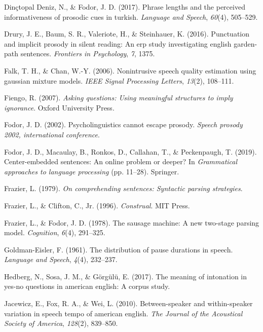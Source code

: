 \documentclass[12pt,oneside]{book}
\begin{document}
\leavevmode\hypertarget{ref-nazik}{}%
Dinçtopal Deniz, N., \& Fodor, J. D. (2017). Phrase lengths and the perceived informativeness of prosodic cues in turkish. \emph{Language and Speech}, \emph{60}(4), 505--529.

\leavevmode\hypertarget{ref-cps}{}%
Drury, J. E., Baum, S. R., Valeriote, H., \& Steinhauer, K. (2016). Punctuation and implicit prosody in silent reading: An erp study investigating english garden-path sentences. \emph{Frontiers in Psychology}, \emph{7}, 1375.

\leavevmode\hypertarget{ref-gmm1}{}%
Falk, T. H., \& Chan, W.-Y. (2006). Nonintrusive speech quality estimation using gaussian mixture models. \emph{IEEE Signal Processing Letters}, \emph{13}(2), 108--111.

\leavevmode\hypertarget{ref-fiengo}{}%
Fiengo, R. (2007). \emph{Asking questions: Using meaningful structures to imply ignorance}. Oxford University Press.

\leavevmode\hypertarget{ref-Fodor2002-io}{}%
Fodor, J. D. (2002). Psycholinguistics cannot escape prosody. \emph{Speech prosody 2002, international conference}.

\leavevmode\hypertarget{ref-fodor2019center}{}%
Fodor, J. D., Macaulay, B., Ronkos, D., Callahan, T., \& Peckenpaugh, T. (2019). Center-embedded sentences: An online problem or deeper? In \emph{Grammatical approaches to language processing} (pp. 11--28). Springer.

\leavevmode\hypertarget{ref-Frazier1979-pb}{}%
Frazier, L. (1979). \emph{On comprehending sentences: Syntactic parsing strategies}.

\leavevmode\hypertarget{ref-frazier1996construal}{}%
Frazier, L., \& Clifton, C., Jr. (1996). \emph{Construal}. MIT Press.

\leavevmode\hypertarget{ref-frazier1978sausage}{}%
Frazier, L., \& Fodor, J. D. (1978). The sausage machine: A new two-stage parsing model. \emph{Cognition}, \emph{6}(4), 291--325.

\leavevmode\hypertarget{ref-goldman1961-pa}{}%
Goldman-Eisler, F. (1961). The distribution of pause durations in speech. \emph{Language and Speech}, \emph{4}(4), 232--237.

\leavevmode\hypertarget{ref-Hedberg2017-er}{}%
Hedberg, N., Sosa, J. M., \& Görgülü, E. (2017). The meaning of intonation in yes-no questions in american english: A corpus study.

\leavevmode\hypertarget{ref-jacewicz2010-sr}{}%
Jacewicz, E., Fox, R. A., \& Wei, L. (2010). Between-speaker and within-speaker variation in speech tempo of american english. \emph{The Journal of the Acoustical Society of America}, \emph{128}(2), 839--850.
\end{document}
